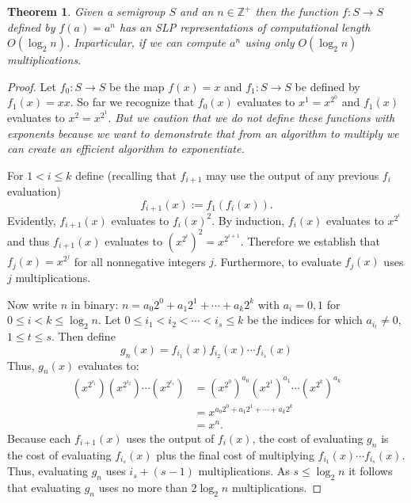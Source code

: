 \documentclass[12pt]{article}
\newtheorem{thm}{Theorem}
\begin{document}
\begin{thm}
Given a semigroup $S$ and an $n\in \mathbb{Z}^+$ then the function
$f:S\rightarrow S$ defined by $f(a)=a^n$ has an SLP representations of
computational length $O(\log_2 n)$.  Inparticular, if we can compute $a^n$
using only $O(\log_2 n)$ multiplications.
\end{thm}
\begin{proof}
Let $f_{0}:S\rightarrow S$ be the map $f(x)=x$ and 
$f_1:S\rightarrow S$ be defined by $f_1(x)=xx$.  So far we
recognize that $f_0(x)$ evaluates to $x^1=x^{2^0}$ and 
$f_1(x)$ evaluates to $x^2=x^{2^1}$.  \emph{But we caution that 
we do not define these functions with exponents because we want
to demonstrate that from an algorithm to multiply we can create
an efficient algorithm to exponentiate.}

For $1<i\leq k$ define (recalling that $f_{i+1}$ may use the output
of any previous $f_i$ evaluation) 
\[f_{i+1}(x):=f_1(f_i(x)).\]
Evidently, $f_{i+1}(x)$ evaluates to $f_i(x)^2$.  By induction,
$f_i(x)$ evaluates to $x^{2^i}$ and thus $f_{i+1}(x)$ evaluates to
$(x^{2^i})^2=x^{2^{i+1}}$.  Therefore we establish that $f_j(x)=x^{2^j}$ 
for all nonnegative integers $j$.  Furthermore, to evaluate $f_j(x)$ uses
$j$ multiplications.

Now write $n$ in binary: $n=a_0 2^0+a_1 2^1 +\cdots +a_k 2^k$ with
$a_i=0,1$ for $0\leq i< k\leq \log_2 n$.  Let $0\leq i_1<i_2<\cdots<i_s\leq k$ be
the indices for which $a_{i_t}\neq 0$, $1\leq t\leq s$.  Then define
\[g_{n}(x)=f_{i_1}(x) f_{i_2}(x)\cdots f_{i_s}(x)\]
Thus, $g_n(x)$ evaluates to:
\begin{align*}
(x^{2^{i_1}}) (x^{2^{i_2}}) \cdots (x^{2^{i_s}}) & =
 (x^{2^0})^{a_0} (x^{2^1})^{a_1} \cdots (x^{2^k})^{a_k}\\
& = x^{a_0 2^0+a_1 2^1+\cdots +a_k 2^k}\\
& = x^n.
\end{align*}
Because each $f_{i+1}(x)$ uses the output of $f_{i}(x)$, the cost of
evaluating $g_n$ is the cost of evaluating $f_{i_s}(x)$ plus the final
cost of multiplying $f_{i_1}(x)\cdots f_{i_s}(x)$.  Thus, evaluating $g_n$
uses $i_s+(s-1)$ multiplications.  As $s\leq \log_2 n$ it follows that
evaluating $g_n$ uses no more than $2\log_2 n$ multiplications.  
\end{proof}


\end{document}
